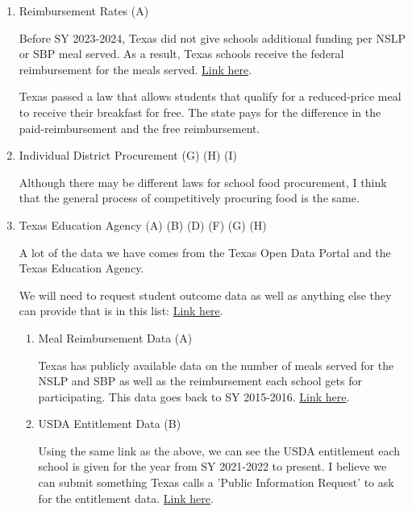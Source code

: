 \documentclass[12pt]{article}
\begin{document}
\begin{enumerate}
	\item Reimbursement Rates (A)
	
	Before SY 2023-2024, Texas did not give schools additional funding per NSLP or SBP meal served. As a result, Texas schools receive the federal reimbursement for the meals served. \href{https://www.fns.usda.gov/cn/rates-reimbursement}{Link here}.
	
	Texas passed a law that allows students that qualify for a reduced-price meal to receive their breakfast for free. The state pays for the difference in the paid-reimbursement and the free reimbursement. 
	
	\item Individual District Procurement (G) (H) (I)
	
	Although there may be different laws for school food procurement, I think that the general process of competitively procuring food is the same. 
	
	\item Texas Education Agency (A) (B) (D) (F) (G) (H)
	
	A lot of the data we have comes from the Texas Open Data Portal and the Texas Education Agency. 
	
	We will need to request student outcome data as well as anything else they can provide that is in this list: \href{https://texaserc.utexas.edu/erc-data/data-inventory/}{Link here}.
	\begin{enumerate}
		\item Meal Reimbursement Data (A)
		
		Texas has publicly available data on the number of meals served for the NSLP and SBP as well as the reimbursement each school gets for participating. This data goes back to SY 2015-2016. \href{https://data.texas.gov/stories/s/TDA-Data-Overview-School-Nutrition-Programs/e2dm-5r4v/#data-available-on-school-nutrition-programs}{Link here}.
		
		\item USDA Entitlement Data (B)
		
		Using the same link as the above, we can see the USDA entitlement each school is given for the year from SY 2021-2022 to present. I believe we can submit something Texas calls a 'Public Information Request' to ask for the entitlement data. \href{https://data.texas.gov/stories/s/TDA-Data-Overview-School-Nutrition-Programs/e2dm-5r4v/#data-available-on-school-nutrition-programs}{Link here}.
		

\end{enumerate}
\end{enumerate}
\end{document}
